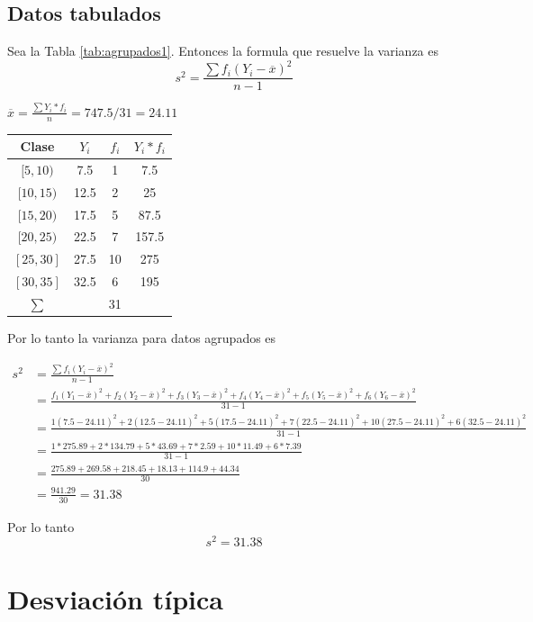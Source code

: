 \documentclass[
  11pt,
]{krantz}
\theoremstyle{definition}
\theoremstyle{definition}
\theoremstyle{definition}
\theoremstyle{definition}
\theoremstyle{remark}
\begin{document}
\hypertarget{datos-tabulados}{%
\subsection{Datos tabulados}\label{datos-tabulados}}

Sea la Tabla \ref{tab:agrupados1}. Entonces la formula que resuelve la varianza es
\[s^2=\frac{\sum f_i\left(Y_i-\overline{x}\right )^2}{n-1}\]

\(\overline{x}=\frac{\sum Y_i*f_i}{n}=747.5/31=24.11\)

\begin{longtable}[]{@{}cccc@{}}
\toprule
Clase & \(Y_i\) & \(f_i\) & \(Y_i*f_i\) \\
\midrule
\endhead
\([5,10)\) & 7.5 & 1 & 7.5 \\
\([10,15)\) & 12.5 & 2 & 25 \\
\([15,20)\) & 17.5 & 5 & 87.5 \\
\([20,25)\) & 22.5 & 7 & 157.5 \\
\([25,30]\) & 27.5 & 10 & 275 \\
\([30,35]\) & 32.5 & 6 & 195 \\
\(\sum\) & & 31 & \\
\bottomrule
\end{longtable}

Por lo tanto la varianza para datos agrupados es

\[
\begin{aligned}
s^2&=\frac{\sum f_i\left(Y_i-\overline{x}\right )^2}{n-1}\\
&=\frac{f_1\left(Y_1-\overline{x}\right )^2+f_2\left(Y_2-\overline{x}\right )^2+f_3\left(Y_3-\overline{x}\right )^2+f_4\left(Y_4-\overline{x}\right )^2+f_5\left(Y_5-\overline{x}\right )^2+f_6\left(Y_6-\overline{x}\right )^2}{31-1}\\
&=\frac{1\left(7.5-24.11\right )^2+2\left(12.5-24.11\right )^2+5\left(17.5-24.11\right )^2+7\left(22.5-24.11\right )^2+10\left(27.5-24.11\right )^2+6\left(32.5-24.11\right )^2}{31-1}
\\
&=\frac{1*275.89+2*134.79+5*43.69+7*2.59+10*11.49+6*7.39}{31-1}
\\
&=\frac{275.89+269.58+218.45+18.13+114.9+44.34}{30}\\
&=\frac{941.29}{30}=31.38
\end{aligned}
\]

Por lo tanto \[s^2=  31.38\]

\hypertarget{desviaciuxf3n-tuxedpica}{%
\section{Desviación típica}\label{desviaciuxf3n-tuxedpica}}
\end{document}
